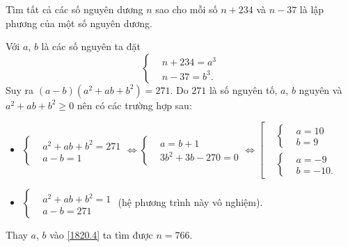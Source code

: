 \begin{ex}%
 Tìm tất cả các số nguyên dương $n$ sao cho mỗi số $n+234$ và $n-37$ là lập phương của một số nguyên dương.
 \loigiai
  {
  Với $a$, $b$ là các số nguyên ta đặt
  \begin{equation}\label{1820.4}
   \left\{\begin{aligned}&n+234=a^3 \\&n-37=b^3. \end{aligned} \right.
  \end{equation}
  Suy ra $(a-b)(a^2+ab+b^2)=271$. Do $271$ là số nguyên tố, $a$, $b$ nguyên và $a^2+ab+b^2 \geq 0$ nên có các trường hợp sau:
  \begin{itemize}
   \item $\left\{\begin{aligned}&a^2+ab+b^2=271 \\&a-b=1 \end{aligned} \right. \Leftrightarrow \left\{\begin{aligned}&a=b+1 \\&3b^2+3b-270=0 \end{aligned} \right. \Leftrightarrow \left[\begin{aligned}&
   \left\{\begin{aligned}&a=10 \\&b=9  \end{aligned}\right. \\& \left\{\begin{aligned}&a=-9 \\&b=-10.   \end{aligned}\right.
   \end{aligned}\right.$
   \item $\left\{\begin{aligned}&a^2+ab+b^2=1 \\&a-b=271 \end{aligned} \right.$ (hệ phương trình này vô nghiệm).
  \end{itemize}
  Thay $a$, $b$ vào \eqref{1820.4} ta tìm được $n=766$.
  }
\end{ex}

